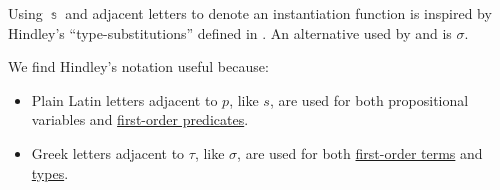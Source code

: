 \begin{remark}\label{rem:substitution_symbol}
  Using \( \Bbbs \) and adjacent letters to denote an instantiation function is inspired by Hindley's \enquote{type-substitutions} defined in \cite[def. 3A1]{Hindley1997BasicSTT}. An alternative used by  and  is \( \sigma \).

  We find Hindley's notation useful because:
  \begin{itemize}
    \item Plain Latin letters adjacent to \( p \), like \( s \), are used for both propositional variables and \hyperref[def:first_order_language/pred]{first-order predicates}.
    \item Greek letters adjacent to \( \tau \), like \( \sigma \), are used for both \hyperref[def:first_order_syntax/term]{first-order terms} and \hyperref[def:simple_type]{types}.
  \end{itemize}
\end{remark}

